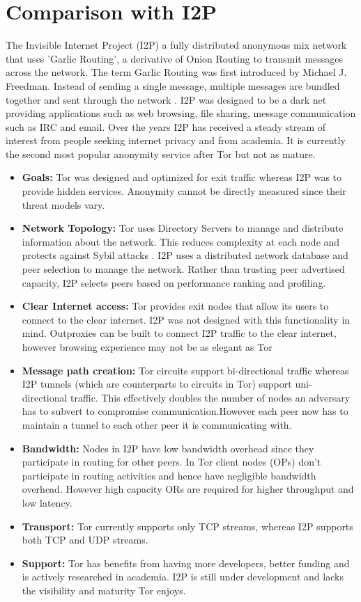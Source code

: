 \documentclass{llncs}
\begin{document}
\section{Comparison with I2P} \label{comparison}
The Invisible Internet Project (I2P) \cite{jrandom2003,zantout2011} a fully distributed anonymous mix network that uses 'Garlic Routing', a derivative of Onion Routing to transmit messages across the network. The term Garlic Routing was first introduced by Michael J. Freedman. Instead of sending a single message, multiple messages are bundled together and sent through the network \cite{garlic-routing}. I2P was designed to be a dark net providing applications such as web browsing, file sharing, message communication such as IRC and email. Over the years I2P has received a steady stream of interest from people seeking internet privacy and from academia. It is currently the second most popular anonymity service after Tor but not as mature.
\begin{itemize}
	\item[]{\textbf{Goals:} Tor was designed and optimized for exit traffic whereas I2P was to provide hidden services. Anonymity cannot be directly measured since their threat models vary.} 
	\item[]{\textbf{Network Topology:} Tor uses Directory Servers to manage and distribute information about the network. This reduces complexity at each node and protects against Sybil attacks \cite{sybil}. I2P uses a distributed network database and peer selection to manage the network. Rather than trusting peer advertised capacity, I2P selects peers based on performance ranking and profiling.}
	\item[]{\textbf{Clear Internet access:} Tor provides exit nodes that allow its users to connect to the clear internet. I2P was not designed with this functionality in mind. Outproxies can be built to connect I2P traffic to the clear internet, however browsing experience may not be as elegant as Tor \cite{ehlert2011:usability-comparison-i2p-tor}}
	\item[]{\textbf{Message path creation:} Tor circuits support bi-directional traffic whereas I2P tunnels (which are counterparts to circuits in Tor) support uni-directional traffic. This effectively doubles the number of nodes an adversary has to subvert to compromise communication.However each peer now has to maintain a tunnel to each other peer it is communicating with.}
	\item[]{\textbf{Bandwidth:} Nodes in I2P have low bandwidth overhead since they participate in routing for other peers. In Tor client nodes (OPs) don't participate in routing activities and hence have negligible bandwidth overhead. However high capacity ORs are required for higher throughput and low latency.}
	\item[]{\textbf{Transport:} Tor currently supports only TCP streams, whereas I2P supports both TCP and UDP streams.}
	\item[]{\textbf{Support:} Tor has benefits from having more developers, better funding and is actively researched in academia. I2P is still under development and lacks the visibility and maturity Tor enjoys.}
\end{itemize}
\end{document}
